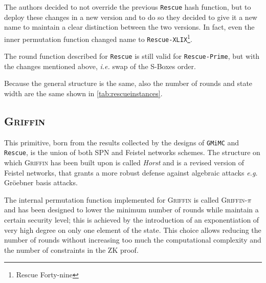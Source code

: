 \documentclass[12pt, a4paper]{report}
\begin{document}
The authors decided to not override the previous \texttt{Rescue} hash function, but to deploy these changes in a new version and to do so they decided to give it a new name to maintain a clear distinction between the two versions.
In fact, even the inner permutation function changed name to \texttt{Rescue-XLIX}\footnote{Rescue Forty-nine}.

The round function described for \texttt{Rescue} is still valid for \texttt{Rescue-Prime}, but with the changes mentioned above, \textsl{i.e.} swap of the S-Boxes order.

Because the general structure is the same, also the number of rounds and state width are the same shown in \autoref{tab:rescueinstances}.

\subsection{\textsc{Griffin}}\label{subsec:griffin}

This primitive, born from the results collected by the designs of \texttt{GMiMC} and \texttt{Rescue}, is the union of both SPN and Feistel networks schemes.
The structure on which \textsc{Griffin} has been built upon is called \textit{Horst} and is a revised version of Feistel networks, that grants a more robust defense against algebraic attacks \textsl{e.g.} Gr\"oebner basis attacks.

The internal permutation function implemented for \textsc{Griffin} is called \textsc{Griffin-$\pi$} and has been designed to lower the minimum number of rounds while maintain a certain security level; this is achieved by the introduction of an exponentiation of very high degree on only one element of the state. This choice allows reducing the number of rounds without increasing too much the computational complexity and the number of constraints in the ZK proof.
\end{document}
